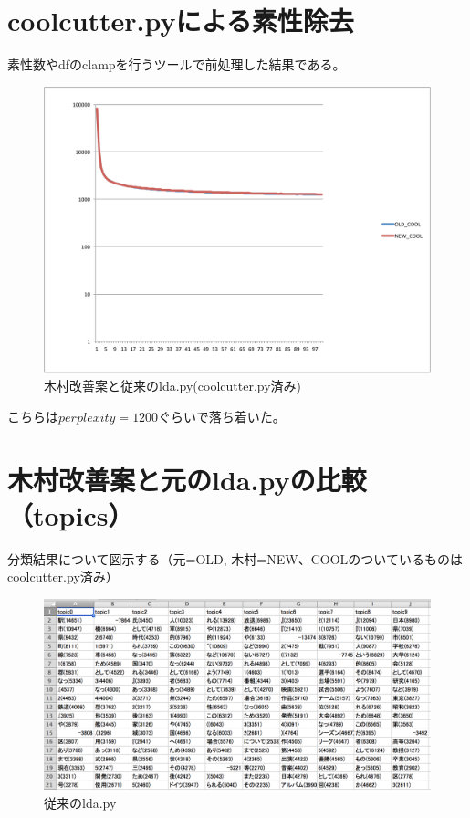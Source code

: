 \documentclass[uplatex,dvipdfmx]{jsarticle}
\begin{document}
\section{coolcutter.pyによる素性除去}
素性数やdfのclampを行うツールで前処理した結果である。

\begin{figure}[htb]
\includegraphics[width=16cm,pagebox=cropbox]{oldandnewcool.pdf}
\caption{木村改善案と従来のlda.py(coolcutter.py済み)}
\end{figure}

こちらは$perplexity=1200$ぐらいで落ち着いた。

\section{木村改善案と元のlda.pyの比較（topics）}
分類結果について図示する（元=OLD, 木村=NEW、COOLのついているものはcoolcutter.py済み）

\begin{figure}[htb]
\includegraphics[width=16cm]{topicsoldnoncool.png}
\caption{従来のlda.py}
\end{figure}
\end{document}
